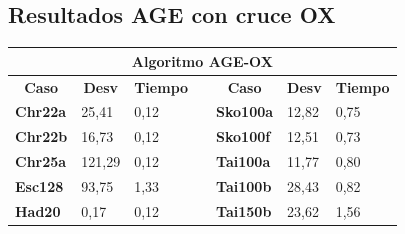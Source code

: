 \documentclass[a4paper, 12pt]{article}
\begin{document}
      
      \newpage
      \subsection{Resultados AGE con cruce OX}
      \begin{table}[H]
\centering
\label{my-label}
\begin{tabular}{|l|l|l|l|l|l|l|}
\hline
\multicolumn{7}{|c|}{\textbf{Algoritmo AGE-OX}}                                                                                                                                                                                                                   \\ \hline
\multicolumn{1}{|c|}{\textbf{Caso}} & \multicolumn{1}{c|}{\textbf{Desv}} & \multicolumn{1}{c|}{\textbf{Tiempo}} & \multicolumn{1}{c|}{\textbf{}} & \multicolumn{1}{c|}{\textbf{Caso}} & \multicolumn{1}{c|}{\textbf{Desv}} & \multicolumn{1}{c|}{\textbf{Tiempo}} \\ \cline{1-3} \cline{5-7} 
\textbf{Chr22a}                     & 25,41                              & 0,12                                 &                                & \textbf{Sko100a}                   & 12,82                              & 0,75                                 \\ \cline{1-3} \cline{5-7} 
\textbf{Chr22b}                     & 16,73                              & 0,12                                 &                                & \textbf{Sko100f}                   & 12,51                              & 0,73                                 \\ \cline{1-3} \cline{5-7} 
\textbf{Chr25a}                     & 121,29                             & 0,12                                 &                                & \textbf{Tai100a}                   & 11,77                              & 0,80                                 \\ \cline{1-3} \cline{5-7} 
\textbf{Esc128}                     & 93,75                              & 1,33                                 &                                & \textbf{Tai100b}                   & 28,43                              & 0,82                                 \\ \cline{1-3} \cline{5-7} 
\textbf{Had20}                      & 0,17                               & 0,12                                 &                                & \textbf{Tai150b}                   & 23,62                              & 1,56                                 \\ \cline{1-3} \cline{5-7} 

\end{tabular}
\end{table}
\end{document}
